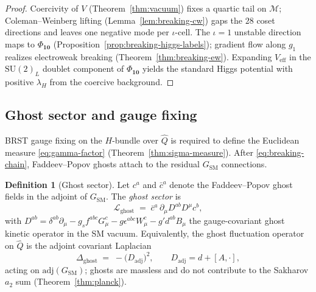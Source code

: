 \documentclass[11pt]{article}
\theoremstyle{plain}
\theoremstyle{definition}
\newtheorem{definition}[theorem]{Definition}
\theoremstyle{remark}
\numberwithin{equation}{section}
\begin{document}
\begin{proof}
Coercivity of $V$ (Theorem~\ref{thm:vacuum}) fixes a quartic tail on
$\mathcal{M}$; Coleman--Weinberg lifting (Lemma~\ref{lem:breaking-cw}) gaps
the $28$ coset directions and leaves one negative mode per $\iota$-cell. The
$\iota=1$ unstable direction maps to $\Phi_{\mathbf{10}}$
(Proposition~\ref{prop:breaking-higgs-labels}); gradient flow along $g_1$
realizes electroweak breaking (Theorem~\ref{thm:breaking-ew}). Expanding
$V_{\mathrm{eff}}$ in the $\mathrm{SU}(2)_L$ doublet component of
$\Phi_{\mathbf{10}}$ yields the standard Higgs potential with positive
$\lambda_H$ from the coercive background.
\end{proof}

\subsection{Ghost sector and gauge fixing}
\label{sec:sm-lagrangian:ghost}

BRST gauge fixing on the $H$-bundle over $\hat Q$ is required to define the
Euclidean measure \eqref{eq:gamma-factor} (Theorem~\ref{thm:sigma-measure}).
After \eqref{eq:breaking-chain}, Faddeev--Popov ghosts attach to the residual
$G_{\mathrm{SM}}$ connections.

\begin{definition}[Ghost sector]\label{def:sm-ghost}
Let $c^a$ and $\bar c^a$ denote the Faddeev--Popov ghost fields in the adjoint
of $G_{\mathrm{SM}}$. The \emph{ghost sector} is
\begin{equation}\label{eq:sm-ghost}
  \mathcal{L}_{\mathrm{ghost}}
  \;=\;
  \bar c^a\,\partial_\mu D^{ab} D^\mu c^b,
\end{equation}
with $D^{ab}=\delta^{ab}\partial_\mu-g_sf^{abc}G_\mu^c-g\epsilon^{abc}W_\mu^c
-g'd^{ab}B_\mu$ the gauge-covariant ghost kinetic operator in the SM vacuum.
Equivalently, the ghost fluctuation operator on $\hat Q$ is the adjoint
covariant Laplacian
\begin{equation}\label{eq:sm-ghost-operator}
  \Delta_{\mathrm{ghost}}
  \;=\;
  -\bigl(D_{\mathrm{adj}}\bigr)^2,
  \qquad
  D_{\mathrm{adj}}=d+[A,\cdot],
\end{equation}
acting on $\mathrm{adj}(G_{\mathrm{SM}})$; ghosts are massless and do not
contribute to the Sakharov $a_2$ sum (Theorem~\ref{thm:planck}).
\end{definition}
\end{document}
